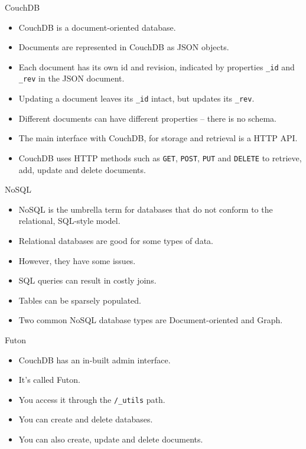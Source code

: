 \documentclass{beamer}
\begin{document}
\begin{frame}{CouchDB}
	\begin{itemize}
		\item CouchDB is a document-oriented database.
		\item Documents are represented in CouchDB as JSON objects.
		\item Each document has its own id and revision, indicated by properties \texttt{_id} and \texttt{_rev} in the JSON document.
		\item Updating a document leaves its \texttt{_id} intact, but updates its \texttt{_rev}.
		\item Different documents can have different properties -- there is no schema.
		\item The main interface with CouchDB, for storage and retrieval is a HTTP API.
		\item CouchDB uses HTTP methods such as \texttt{GET}, \texttt{POST}, \texttt{PUT} and \texttt{DELETE} to retrieve, add, update and delete documents.
	\end{itemize}
\end{frame}


\begin{frame}{NoSQL}
	\begin{itemize}
		\item NoSQL is the umbrella term for databases that do not conform to the relational, SQL-style model.
		\item Relational databases are good for some types of data.
		\item However, they have some issues.
		\item SQL queries can result in costly joins.
		\item Tables can be sparsely populated.
		\item Two common NoSQL database types are Document-oriented and Graph.
	\end{itemize}
\end{frame}


\begin{frame}{Futon}
	\begin{itemize}
		\item CouchDB has an in-built admin interface.
		\item It's called Futon.
		\item You access it through the \texttt{/_utils} path.
		\item You can create and delete databases.
		\item You can also create, update and delete documents.
	\end{itemize}
\end{frame}
\end{document}
